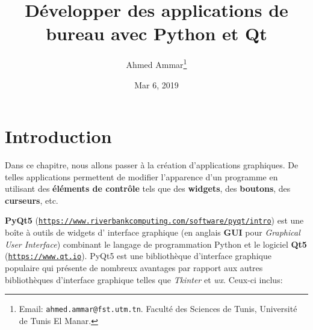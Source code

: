 \documentclass[%
oneside,                 %
final,                   %
10pt,french]{article}
\begin{document}

\newcommand{\exercisesection}[1]{\subsection*{#1}}






\title{Développer des applications de bureau avec Python et Qt}


\author{Ahmed Ammar\footnote{Email: \texttt{ahmed.ammar@fst.utm.tn}. Faculté des Sciences de Tunis, Université de Tunis El Manar.}}


\date{Mar 6, 2019}
\maketitle

\tableofcontents


\vspace{1cm} %




\section{Introduction}
Dans ce chapitre, nous allons passer à la création d’applications graphiques. De telles applications permettent de modifier l'apparence d'un programme en utilisant des \textbf{éléments de contrôle} tels que des \textbf{widgets}, des \textbf{boutons}, des \textbf{curseurs}, etc.

\textbf{PyQt5} (\href{{https://www.riverbankcomputing.com/software/pyqt/intro}}{\nolinkurl{https://www.riverbankcomputing.com/software/pyqt/intro}}) est une boîte à outils de widgets d' interface graphique (en anglais \textbf{GUI} pour \emph{Graphical User Interface}) combinant le langage de programmation Python et le logiciel \textbf{Qt5} (\href{{https://www.qt.io}}{\nolinkurl{https://www.qt.io}}). PyQt5 est une bibliothèque d'interface graphique populaire qui présente de nombreux avantages par rapport aux autres bibliothèques d'interface graphique telles que \emph{Tkinter} et \emph{wx}. Ceux-ci inclus:
\end{document}
